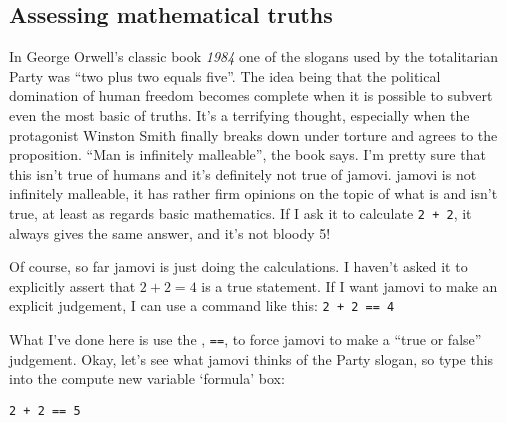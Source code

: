\subsection{Assessing mathematical truths}

In George Orwell's classic book {\it 1984} one of the slogans used by the totalitarian Party was ``two plus two equals five''. The idea being that the political domination of human freedom becomes complete when it is possible to subvert even the most basic of truths. It's a terrifying thought, especially when the protagonist Winston Smith finally breaks down under torture and agrees to the proposition. ``Man is infinitely malleable'', the book says. I'm pretty sure that this isn't true of humans and it's definitely not true of jamovi. jamovi is not infinitely malleable, it has rather firm opinions on the topic of what is and isn't true, at least as regards basic mathematics. If I ask it to calculate \texttt{2 + 2}, it always gives the same answer, and it's not bloody 5!

Of course, so far jamovi is just doing the calculations. I haven't asked it to explicitly assert that $2+2 = 4$ is a true statement. If I want jamovi to make an explicit judgement, I can use a command like this: \texttt{2 + 2 == 4}

What I've done here is use the , \texttt{==}, to force jamovi to make a ``true or false'' judgement. Okay, let's see what jamovi thinks of the Party slogan, so type this into the compute new variable `formula' box: 

\begin{verbatim}
2 + 2 == 5
\end{verbatim}

